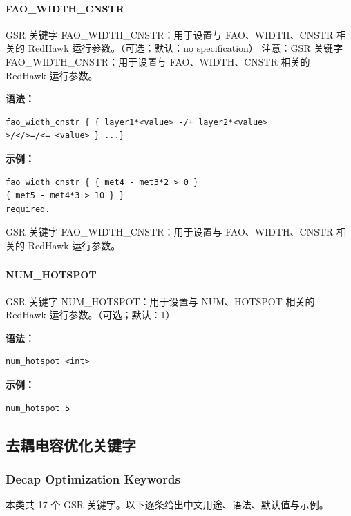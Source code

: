 \paragraph*{FAO_WIDTH_CNSTR}

GSR 关键字 FAO_WIDTH_CNSTR：用于设置与 FAO、WIDTH、CNSTR 相关的 RedHawk 运行参数。（可选；默认：no specification） 注意：GSR 关键字 FAO_WIDTH_CNSTR：用于设置与 FAO、WIDTH、CNSTR 相关的 RedHawk 运行参数。

\textbf{语法：}
\begin{lstlisting}
fao_width_cnstr { { layer1*<value> -/+ layer2*<value>
>/</>=/<= <value> } ...}
\end{lstlisting}

\textbf{示例：}
\begin{lstlisting}
fao_width_cnstr { { met4 - met3*2 > 0 }
{ met5 - met4*3 > 10 } }
required.
\end{lstlisting}

\begin{noteBox}
GSR 关键字 FAO\_WIDTH\_CNSTR：用于设置与 FAO、WIDTH、CNSTR 相关的 RedHawk 运行参数。
\end{noteBox}

\subsubsection{}
\paragraph*{NUM_HOTSPOT}

GSR 关键字 NUM_HOTSPOT：用于设置与 NUM、HOTSPOT 相关的 RedHawk 运行参数。（可选；默认：1）

\textbf{语法：}
\begin{lstlisting}
num_hotspot <int>
\end{lstlisting}

\textbf{示例：}
\begin{lstlisting}
num_hotspot 5
\end{lstlisting}

\subsection{去耦电容优化关键字}
\subsubsection*{Decap Optimization Keywords}

本类共 17 个 GSR 关键字。以下逐条给出中文用途、语法、默认值与示例。

